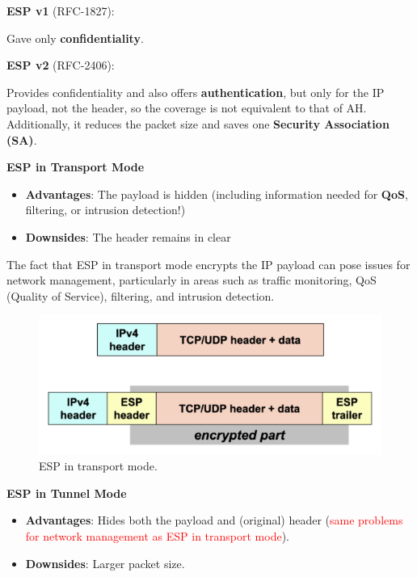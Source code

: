 \hfill

\textbf{ESP v1} (RFC-1827):

Gave only \textbf{confidentiality}.

\hfill

\textbf{ESP v2} (RFC-2406):

Provides confidentiality and also offers \textbf{authentication}, but only for the IP payload, not the header, so the coverage is not equivalent to that of AH. Additionally, it reduces the packet size and saves one \textbf{Security Association (SA)}.

\begin{center}
    \textbf{ESP in Transport Mode}
\end{center}
\begin{itemize}
    \item \textbf{Advantages}: The payload is hidden (including information needed for \textbf{QoS}, filtering, or intrusion detection!)
    \item \textbf{Downsides}: The header remains in clear
\end{itemize}

\begin{tcolorbox}[colback=red!10!white, colframe=red!70!black, coltitle=white, title=Bad News for Network Management]
    The fact that ESP in transport mode encrypts the IP payload can pose issues for network management, particularly in areas such as traffic monitoring, QoS (Quality of Service), filtering, and intrusion detection.
\end{tcolorbox}

\begin{figure}[H]
  \includegraphics[width=\linewidth]{Images/NetSec/esp_transport_mode.png}
  \caption{ESP in transport mode.}
\end{figure}

\begin{center}
    \textbf{ESP in Tunnel Mode}
\end{center}
\begin{itemize}
    \item \textbf{Advantages}: Hides both the payload and (original) header (\textcolor{red}{same problems for network management as ESP in transport mode}).
    \item \textbf{Downsides}: Larger packet size.
\end{itemize}

